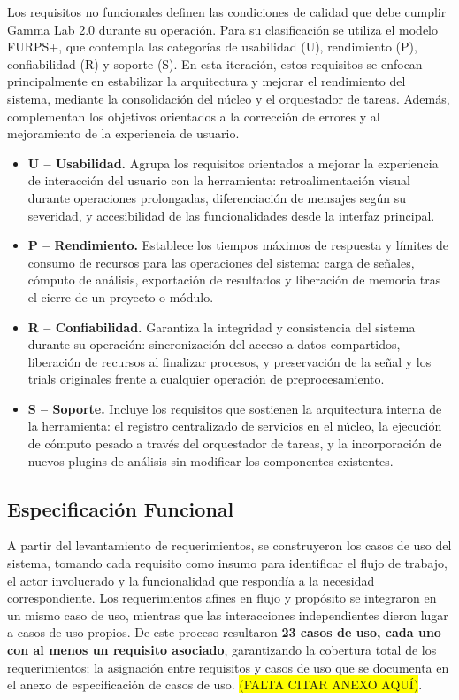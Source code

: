\documentclass[12pt,letterpaper,oneside]{article}
\begin{document}
Los requisitos no funcionales definen las condiciones de calidad que debe cumplir Gamma Lab 2.0 durante su operación. Para su clasificación se utiliza el modelo FURPS+, que contempla las categorías de usabilidad (U), rendimiento (P), confiabilidad (R) y soporte (S). En esta iteración, estos requisitos se enfocan principalmente en estabilizar la arquitectura y mejorar el rendimiento del sistema, mediante la consolidación del núcleo y el orquestador de tareas. Además, complementan los objetivos orientados a la corrección de errores y al mejoramiento de la experiencia de usuario.

\begin{itemize}
    \item \textbf{U -- Usabilidad.} Agrupa los requisitos orientados a mejorar la experiencia de interacción del usuario con la herramienta: retroalimentación visual durante operaciones prolongadas, diferenciación de mensajes según su severidad, y accesibilidad de las funcionalidades desde la interfaz principal.

    \item \textbf{P -- Rendimiento.} Establece los tiempos máximos de respuesta y límites de consumo de recursos para las operaciones del sistema: carga de señales, cómputo de análisis, exportación de resultados y liberación de memoria tras el cierre de un proyecto o módulo.

    \item \textbf{R -- Confiabilidad.} Garantiza la integridad y consistencia del sistema durante su operación: sincronización del acceso a datos compartidos, liberación de recursos al finalizar procesos, y preservación de la señal y los trials originales frente a cualquier operación de preprocesamiento.

    \item \textbf{S -- Soporte.} Incluye los requisitos que sostienen la arquitectura interna de la herramienta: el registro centralizado de servicios en el núcleo, la ejecución de cómputo pesado a través del orquestador de tareas, y la incorporación de nuevos plugins de análisis sin modificar los componentes existentes.
\end{itemize}

\subsection{Especificación Funcional}

A partir del levantamiento de requerimientos, se construyeron los casos de uso del sistema, tomando cada requisito como insumo para identificar el flujo de trabajo, el actor involucrado y la funcionalidad que respondía a la necesidad correspondiente. Los requerimientos afines en flujo y propósito se integraron en un mismo caso de uso, mientras que las interacciones independientes dieron lugar a casos de uso propios. De este proceso resultaron \textbf{23 casos de uso, cada uno con al menos un requisito asociado}, garantizando la cobertura total de los requerimientos; la asignación entre requisitos y casos de uso que se documenta en el anexo de especificación de casos de uso. \colorbox{yellow}{(FALTA CITAR ANEXO AQUÍ)}.
\end{document}

